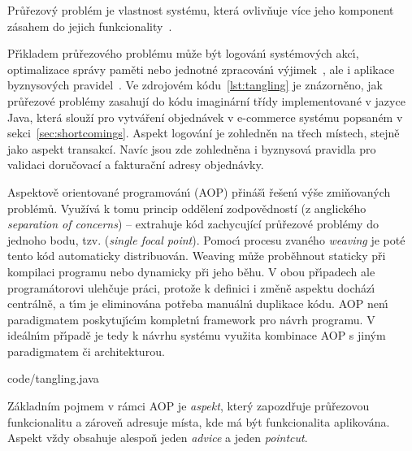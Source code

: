 \begin{definition}
    Průřezový problém je vlastnost systému, která ovlivňuje více jeho komponent
    zásahem do jejich funkcionality~\cite{kiczales1997aspect}.
\end{definition}

Př\'{\i}kladem průřezového problému může b\'yt logován\'{\i}
systémov\'ych akc\'{\i}, optimalizace správy paměti
nebo jednotné zpracován\'{\i} v\'yjimek~\cite{kiczales1997aspect},
ale i aplikace byznysových pravidel~\cite{cemus2014aspect}.
Ve zdrojovém kódu~\ref{lst:tangling} je znázorněno, jak průřezové
problémy zasahují do kódu imaginární třídy implementované v
jazyce Java, která slouží pro vytváření objednávek v e-commerce
systému popsaném v sekci~\ref{sec:shortcomings}.
Aspekt logování je zohledněn na třech místech, stejně jako aspekt transakcí.
Navíc jsou zde zohledněna i byznysová pravidla pro validaci doručovací
a fakturační adresy objednávky.

Aspektově orientované programován\'{\i} (\gls{AOP}) přináš\'{\i} řešen\'{\i}
v\'yše zmiňovaných problémů. Využívá k tomu princip oddělení zodpovědností (z anglického \textit{separation
of concerns}) -- extrahuje kód zachycující průřezové problémy do jednoho bodu, tzv. (\textit{single focal point}).
Pomoc\'{\i} procesu zvaného \textit{weaving} je poté tento kód automaticky distribuován.
Weaving může proběhnout staticky při kompilaci programu nebo dynamicky
při jeho běhu. V obou př\'{\i}padech ale programátorovi ulehčuje práci,
protože k definici i změně aspektu docház\'{\i} centrálně, a t\'{\i}m je eliminována
potřeba manuáln\'{\i} duplikace kódu. \gls{AOP} nen\'{\i} paradigmatem poskytuj\'{\i}c\'{\i}m
kompletn\'{\i} framework pro návrh programu. V ideáln\'{\i}m př\'{\i}padě je tedy k návrhu
systému využita kombinace \gls{AOP} s jin\'ym paradigmatem či architekturou.


{code/tangling.java}

Základním pojmem v rámci \gls{AOP} je \textit{aspekt},
který zapozdřuje průřezovou funkcionalitu a zároveň adresuje místa, kde má být
funkcionalita aplikována. Aspekt vždy obsahuje alespoň jeden \textit{advice}
a jeden \textit{pointcut}.

